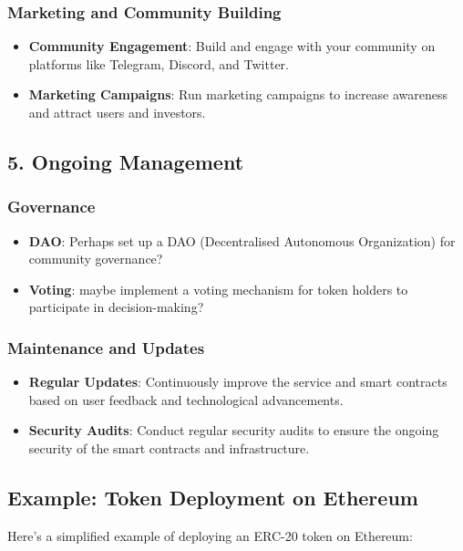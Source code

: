 \documentclass{tufte-handout}
\begin{document}
\subsubsection*{Marketing and Community Building}
\begin{itemize}
    \item \textbf{Community Engagement}: Build and engage with your community on platforms like Telegram, Discord, and Twitter.
    \item \textbf{Marketing Campaigns}: Run marketing campaigns to increase awareness and attract users and investors.
\end{itemize}

\subsection*{5. Ongoing Management}

\subsubsection*{Governance}
\begin{itemize}
    \item \textbf{DAO}: Perhaps set up a DAO (Decentralised Autonomous Organization) for community governance?
    \item \textbf{Voting}: maybe implement a voting mechanism for token holders to participate in decision-making?
\end{itemize}

\subsubsection*{Maintenance and Updates}
\begin{itemize}
    \item \textbf{Regular Updates}: Continuously improve the service and smart contracts based on user feedback and technological advancements.
    \item \textbf{Security Audits}: Conduct regular security audits to ensure the ongoing security of the smart contracts and infrastructure.
\end{itemize}

\subsection*{Example: Token Deployment on Ethereum}

Here's a simplified example of deploying an ERC-20 token on Ethereum:
\end{document}
